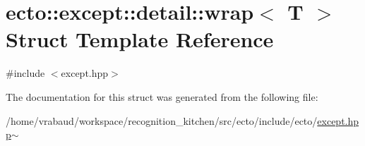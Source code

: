 \hypertarget{structecto_1_1except_1_1detail_1_1wrap}{\section{ecto\-:\-:except\-:\-:detail\-:\-:wrap$<$ T $>$ Struct Template Reference}
\label{structecto_1_1except_1_1detail_1_1wrap}
}


{\ttfamily \#include $<$except.\-hpp$>$}



The documentation for this struct was generated from the following file\-:\begin{DoxyCompactItemize}
\item 
/home/vrabaud/workspace/recognition\-\_\-kitchen/src/ecto/include/ecto/\hyperlink{except_8hpp~}{except.\-hpp$\sim$}\end{DoxyCompactItemize}
